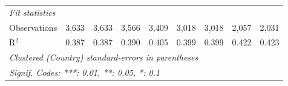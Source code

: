 \begin{tabular}{lcccccccc}
   \midrule \emph{Fit statistics}\\
   Observations                                                               & 3,633        & 3,633        & 3,566        & 3,409        & 3,018        & 3,018        & 2,057       & 2,031\\  
   R$^2$                                                                      & 0.387        & 0.387        & 0.390        & 0.405        & 0.399        & 0.399        & 0.422       & 0.423\\  
   \midrule
   \multicolumn{9}{l}{\emph{Clustered (Country) standard-errors in parentheses}}\\
   \multicolumn{9}{l}{\emph{Signif. Codes: ***: 0.01, **: 0.05, *: 0.1}}\\
\end{tabular}
\par\endgroup


